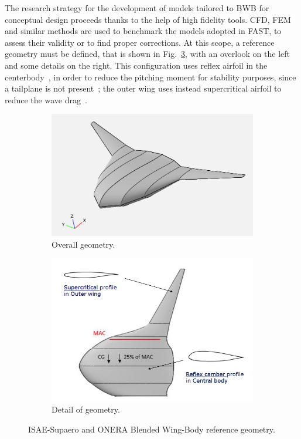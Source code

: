 The research strategy for the development of models tailored to BWB for conceptual design proceeds thanks to the help of high fidelity tools. 
CFD, FEM and similar methods are used to benchmark the models adopted in FAST, to assess their validity or to find proper corrections. 
At this scope, a reference geometry must be defined, that is shown in Fig.~\ref{fig:bwb_ref_geometry}, with an overlook on the left and some details on the right.
This configuration uses reflex airfoil in the centerbody~\cite{bib:mh_airfoiltool, bib:eppler}, in order to reduce the pitching moment for stability purposes, since a tailplane is not present~\cite{bib:alex, bib:stettner}; the outer wing uses instead supercritical airfoil to reduce the wave drag~\cite{bib:sargeant}.
\begin{figure}[!h]
	\centering
	\begin{subfigure}{0.4\textwidth}
		\includegraphics[keepaspectratio, width=\linewidth]{images/chap4/bwb_ref_geometry.jpg}
		\caption{Overall geometry.}
		\label{fig:bwb_ref_geom_overlook}
	\end{subfigure}
	\begin{subfigure}{0.4\textwidth}
		\includegraphics[keepaspectratio, width=0.9\linewidth]{images/chap4/bwb_ref_geometry_detail.jpg}
		\caption{Detail of geometry.}
		\label{fig:bwb_ref_geom_detail}
	\end{subfigure}
	\caption{ISAE-Supaero and ONERA Blended Wing-Body reference geometry.}
	\label{fig:bwb_ref_geometry}
\end{figure}

